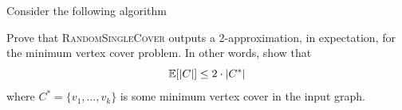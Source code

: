 \documentclass[12pt, letterpaper]{article}
\begin{document}
\begin{subproblem}{}
  Consider the following algorithm 

    \begin{minipage}{\linewidth}
      \begin{algorithm}[H]
        \begin{algorithmic}[1]
          \EndWhile
          \EndFunction
        \end{algorithmic}    
      \end{algorithm}
    \end{minipage}

    Prove that \textsc{RandomSingleCover} outputs a 2-approximation, in expectation, for the minimum vertex cover problem. In other words, show that
  \[
    \mathbb{E}[|C|] \leq 2 \cdot |C^*|
  \]
  where $C^* = \{v_{1}, \ldots, v_{k}\}$ is some minimum vertex cover in the input graph.
\end{subproblem}
\end{document}
